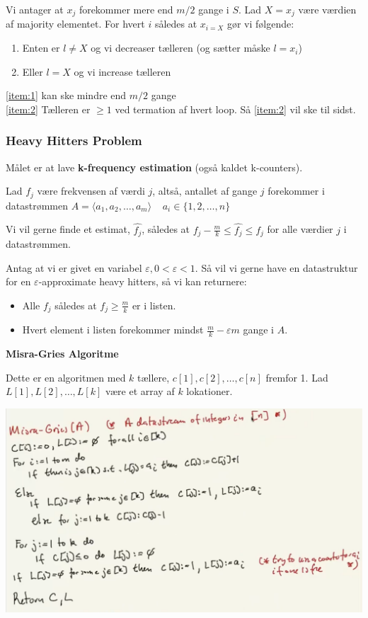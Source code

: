 \documentclass[11pt]{article}
\theoremstyle{definition}
\theoremstyle{remark}
\begin{document}
Vi antager at $x_{j}$ forekommer mere end $m/2$ gange i $S$. Lad $X = x_{j}$ være værdien af majority elementet. For hvert $i$ således at $x_{i = X}$ gør vi følgende:

\begin{enumerate}
\item\label{item:1} Enten er $l \neq X$ og vi decreaser tælleren (og sætter måske $l = x_{i}$)
\item\label{item:2} Eller $l = X$ og vi increase tælleren
\end{enumerate}

\noindent
\ref{item:1} kan ske mindre end $m/2$ gange\\
\noindent
\ref{item:2} Tælleren er $\geq 1$ ved termation af hvert loop. Så \ref{item:2} vil ske til sidst.

\subsubsection{Heavy Hitters Problem}

Målet er at lave \textbf{k-frequency estimation} (også kaldet k-counters).

Lad $f_{j}$ være frekvensen af værdi $j$, altså, antallet af gange $j$ forekommer i datastrømmen $A = \langle a_{1}, a_{2}, \ldots, a_{m} \rangle\;\;\;\;a_{i} \in \{1, 2, \ldots, n\}$

Vi vil gerne finde et estimat, $\hat{f_{j}}$, således at $f_{j} - \frac{m}{k} \leq \hat{f_{j}} \leq f_{j}$ for alle værdier $j$ i datastrømmen.

Antag at vi er givet en variabel $\varepsilon, 0 < \varepsilon < 1$. Så vil vi gerne have en datastruktur for en $\varepsilon$-approximate heavy hitters, så vi kan returnere:
\begin{itemize}
\item Alle $f_{j}$ således at $f_{j} \geq \frac{m}{k}$ er i listen.
\item Hvert element i listen forekommer mindst $\frac{m}{k} - \varepsilon m$ gange i $A$.
\end{itemize}

\noindent
\large\textbf{Misra-Gries Algoritme}

Dette er en algoritmen med $k$ tællere, $c[1], c[2], \ldots, c[n]$ fremfor 1. Lad $L[1], L[2], \ldots, L[k]$ være et array af $k$ lokationer.

\begin{center}
\includegraphics[scale=0.3]{misra.png}
\end{center}
\end{document}
